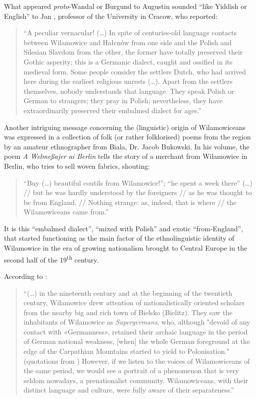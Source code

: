 \documentclass[output=paper]{langscibook}
\begin{document}
What appeared \textit{proto}-Wandal or Burgund to Augustin sounded “like Yiddish or English” to Jan \citet{lepkowski_notatki_1853}, professor of the University in Cracow, who reported:

\begin{quote}
    “A peculiar vernacular! (\ldots) In spite of centuries-old language contacts between Wilamowice and Hałcnów from one side and the Polish and Silesian Slavdom from the other, the former have totally preserved their Gothic asperity; this is a Germanic dialect, caught and ossified in its medieval form. Some people consider the settlers Dutch, who had arrived here during the earliest religious unrests (\ldots). Apart from the settlers themselves, nobody understands that language. They speak Polish or German to strangers; they pray in Polish; nevertheless, they have extraordinarily preserved their embalmed dialect for ages.”
\end{quote}

Another intriguing message concerning the (linguistic) origin of Wilamowiceans was expressed in a collection of folk (or rather folklorised) poems from the region by an amateur ethnographer from Biala, Dr. Jacob Bukowski. In his \citeyear{bukowski_poems_1860} volume, the poem \textit{A Welmeßajer ai Berlin} tells the story of a merchant from Wilamowice in Berlin, who tries to sell woven fabrics, shouting:

\begin{quote}
    “Buy (\ldots) beautiful coutils from Wilamowice!”; “he spent a week there” (\ldots) // but he was hardly understood by the foreigners // as he was thought to be from England. // Nothing strange: as, indeed, that is where // the Wilamowiceans came from.”
\end{quote}

It is this “embalmed dialect”, “mixed with Polish” and exotic “from-England”, that started functioning as the main factor of the ethnolinguistic identity of Wilamowice in the era of growing nationalism brought to Central Europe in the second half of the 19\textsuperscript{th} century.


According to \citet[96]{chromik_wilamowice_2016}:

\begin{quote}
    “(\ldots) in the nineteenth century and at the beginning of the twentieth century, Wilamowice drew attention of nationalistically oriented scholars from the nearby big and rich town of Bielsko (Bielitz). They saw the inhabitants of Wilamowice as \textit{Supergermans}, who, although "devoid of any contact with «Germanness», retained their archaic language in the period of German national weakness, [when] the whole German foreground at the edge of the Carpathian Mountains started to yield to Polonisation." (quotations from \citealt[]{filip_flamandowie_2005}) However, if we listen to the voices of Wilamowiceans of the same period, we would see a portrait of a phenomenon that is very seldom nowadays, a prenationalist community. Wilamowiceans, with their distinct language and culture, were fully aware of their separateness.”
\end{quote}
\end{document}

